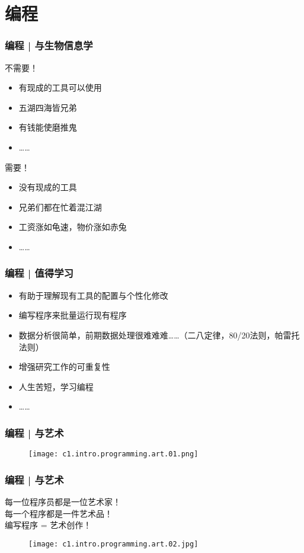\section{编程}
\begin{frame}
  \frametitle{编程 | 与生物信息学}
  \begin{block}{不需要！}
    \begin{itemize}
      \item 有现成的工具可以使用
      \item 五湖四海皆兄弟
      \item 有钱能使磨推鬼
      \item ……
    \end{itemize}
  \end{block}
  \pause
  \begin{block}{需要！}
    \begin{itemize}
      \item 没有现成的工具
      \item 兄弟们都在忙着混江湖
      \item 工资涨如龟速，物价涨如赤兔
      \item ……
    \end{itemize}
  \end{block}
\end{frame}

\begin{frame}
  \frametitle{编程 | 值得学习}
  \begin{itemize}
    \item 有助于理解现有工具的配置与个性化修改
    \item 编写程序来批量运行现有程序
    \item
      数据分析很简单，前期数据处理很难难难……（二八定律，80/20法则，帕雷托法则）
    \item 增强研究工作的可重复性
    \item 人生苦短，学习编程
    \item ……
  \end{itemize}
\end{frame}

\begin{frame}
  \frametitle{编程 | 与艺术}
  \begin{figure}
    \centering
    \texttt{[image: c1.intro.programming.art.01.png]}
  \end{figure}
\end{frame}

\begin{frame}
  \frametitle{编程 | 与艺术}
  \begin{center}
    \large{每一位程序员都是一位艺术家！\\
    每一个程序都是一件艺术品！\\
    编写程序 = 艺术创作！}
\end{center}
\vspace{-1em}
  \begin{figure}
    \centering
    \texttt{[image: c1.intro.programming.art.02.jpg]}
  \end{figure}
\end{frame}

